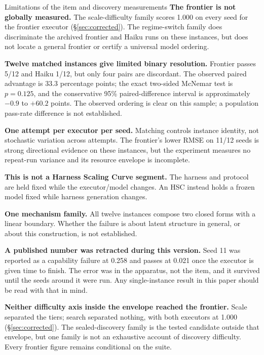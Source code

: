 \documentclass[11pt]{article}
\theoremstyle{definition}
\begin{document}
\begin{cautionbox}{Limitations of the item and discovery measurements}
\textbf{The frontier is not globally measured.} The scale-difficulty family scores 1.000 on every seed for the frontier executor (\S\ref{sec:corrected}). The regime-switch family does discriminate the archived frontier and Haiku runs on these instances, but does not locate a general frontier or certify a universal model ordering.

\textbf{Twelve matched instances give limited binary resolution.} Frontier passes 5/12 and Haiku 1/12, but only four pairs are discordant. The observed paired advantage is 33.3 percentage points; the exact two-sided McNemar test is $p=0.125$, and the conservative 95\% paired-difference interval is approximately $-0.9$ to $+60.2$ points. The observed ordering is clear on this sample; a population pass-rate difference is not established.

\textbf{One attempt per executor per seed.} Matching controls instance identity, not stochastic variation across attempts. The frontier's lower RMSE on 11/12 seeds is strong directional evidence on these instances, but the experiment measures no repeat-run variance and its resource envelope is incomplete.

\textbf{This is not a Harness Scaling Curve segment.} The harness and protocol are held fixed while the executor/model changes. An HSC instead holds a frozen model fixed while harness generation changes.

\textbf{One mechanism family.} All twelve instances compose two closed forms with a linear boundary. Whether the failure is about latent structure in general, or about this construction, is not established.

\textbf{A published number was retracted during this version.} Seed 11 was reported as a capability failure at 0.258 and passes at 0.021 once the executor is given time to finish. The error was in the apparatus, not the item, and it survived until the seeds around it were run. Any single-instance result in this paper should be read with that in mind.

\textbf{Neither difficulty axis inside the envelope reached the frontier.} Scale separated the tiers; search separated nothing, with both executors at 1.000 (\S\ref{sec:corrected}). The sealed-discovery family is the tested candidate outside that envelope, but one family is not an exhaustive account of discovery difficulty. Every frontier figure remains conditional on the suite.


\end{cautionbox}
\end{document}
